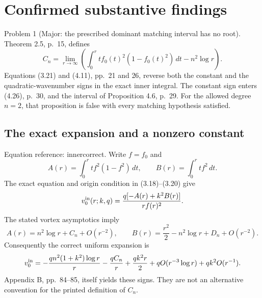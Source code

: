 \documentclass[10pt]{article}
\begin{document}
\section*{Confirmed substantive findings}
Problem 1 (Major: the prescribed dominant matching interval has no root).  Theorem 2.5, p. 15, defines \[C_n=\lim_{r\to\infty}
 \left(\int_0^r t f_0(t)^2(1-f_0(t)^2)\,dt-n^2\log r\right).\] Equations (3.21) and (4.11), pp. 21 and 26, reverse both the constant and the quadratic-wavenumber signs in the exact inner integral. The constant sign enters (4.26), p. 30, and the interval of Proposition 4.6, p. 29. For the allowed degree \(n=2\), that proposition is false with every matching hypothesis satisfied.\par
\subsection*{The exact expansion and a nonzero constant}
Equation reference: innercorrect. Write \(f=f_0\) and \[A(r)=\int_0^r t f^2(1-f^2)\,dt,\qquad
 B(r)=\int_0^r t f^2\,dt.\] The exact equation and origin condition in (3.18)–(3.20) give \[v_0^{\rm in}(r;k,q)=\frac{q[-A(r)+k^2B(r)]}{r f(r)^2}.\] The stated vortex asymptotics imply \[A(r)=n^2\log r+C_n+O(r^{-2}),\qquad
 B(r)=\frac{r^2}{2}-n^2\log r+D_n+O(r^{-2}).\] Consequently the correct uniform expansion is \[
 v_0^{\rm in}=-\frac{qn^2(1+k^2)\log r}{r}
       -\frac{qC_n}{r}+\frac{qk^2r}{2}
       +qO(r^{-3}\log r)+qk^2O(r^{-1}).\] Appendix B, pp. 84–85, itself yields these signs. They are not an alternative convention for the printed definition of \(C_n\).\par
\end{document}
